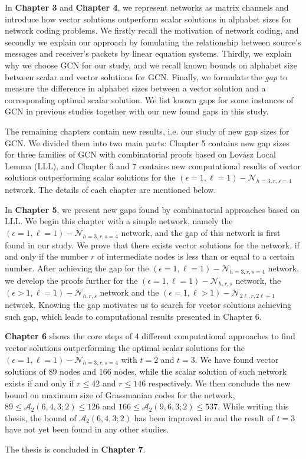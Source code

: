 In \textbf{Chapter 3} and \textbf{Chapter 4}, we represent networks
as matrix channels and introduce how vector solutions outperform scalar
solutions in alphabet sizes for network coding problems. We firstly
recall the motivation of network coding, and secondly we explain our
approach by fomulating the relationship between source's messages
and receiver's packets by linear equation systems. Thirdly, we explain
why we choose GCN for our study, and we recall known bounds on alphabet
size between scalar and vector solutions for GCN. Finally, we formulate
the \textit{gap} to measure the difference in alphabet sizes between
a vector solution and a corresponding optimal scalar solution. We
list known gaps for some instances of GCN in previous studies together
with our new found gaps in this study.

The remaining chapters contain new results, i.e. our study of new
gap sizes for GCN. We divided them into two main parts: Chapter 5
contains new gap sizes for three families of GCN with combinatorial
proofs based on Lov\'asz Local Lemma (LLL), and Chapter 6 and 7 contains
new computational results of vector solutions outperforming scalar
solutions for the $\left(\epsilon=1,\ell=1\right)-\mathcal{N}_{h=3,r,s=4}$
network. The details of each chapter are mentioned below.

In \textbf{Chapter 5}, we present new gaps found by combinatorial
approaches based on LLL. We begin this chapter with a simple network,
namely the $\left(\epsilon=1,\ell=1\right)-\mathcal{N}_{h=3,r,s=4}$
network, and the gap of this network is first found in our study.
We prove that there exists vector solutions for the network, if and
only if the number $r$ of intermediate nodes is less than or equal
to a certain number. After achieving the gap for the $\left(\epsilon=1,\ell=1\right)-\mathcal{N}_{h=3,r,s=4}$
network, we develop the proofs further for the $\left(\epsilon=1,\ell=1\right)-\mathcal{N}_{h,r,s}$
network, the $\left(\epsilon>1,\ell=1\right)-\mathcal{N}_{h,r,s}$
network and the $\left(\epsilon=1,\ell>1\right)-\mathcal{N}_{2\ell,r,2\ell+1}$
network. Knowing the gap motivates us to search for vector solutions
achieving such gap, which leads to computational results presented
in Chapter 6.

\textbf{Chapter 6} shows the core steps of 4 different computational
approaches to find vector solutions outperforming the optimal scalar
solutions for the $\left(\epsilon=1,\ell=1\right)-\mathcal{N}_{h=3,r,s=4}$
with $t=2$ and $t=3$. We have found vector solutions of 89 nodes
and 166 nodes, while the scalar solution of such network exists if
and only if $r\leq42$ and $r\leq146$ respectively. We then conclude
the new bound on maximum size of Grassmanian codes for the network,
$89\leq\mathcal{A}_{2}\left(6,4,3;2\right)\leq126$ and $166\leq\mathcal{A}_{2}\left(9,6,3;2\right)\leq537$.
While writing this thesis, the bound of $\mathcal{A}_{2}\left(6,4,3;2\right)$
has been improved in \cite{Etzion:2018} and the result of $t=3$
have not yet been found in any other studies. 

The thesis is concluded in \textbf{Chapter 7}. 

\clearpage
